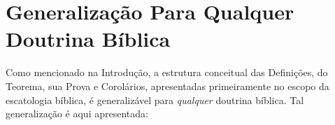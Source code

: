 
\appendix



\section{Generalização Para Qualquer Doutrina Bíblica}

    Como mencionado na Introdução, a estrutura conceitual das Definições, do  Teorema,  sua  Prova  e  Corolários,  apresentadas
    primeiramente no escopo da escatologia bíblica, é generalizável para \emph{qualquer} doutrina bíblica. Tal  generalização  é
    aqui apresentada:


